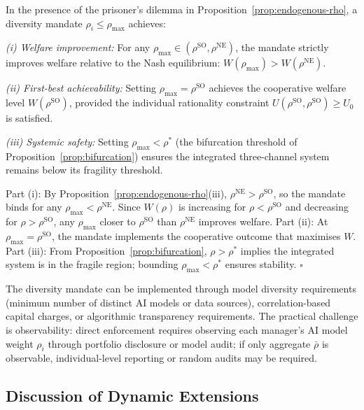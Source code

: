 \begin{proposition}\label{prop:diversity-mandate}
  In the presence of the prisoner's dilemma in Proposition~\ref{prop:endogenous-rho}, a diversity mandate $\rho_i \leq \rho_{\max}$ achieves:

  \emph{(i) Welfare improvement:} For any $\rho_{\max} \in (\rho^{\text{SO}}, \rho^{\text{NE}})$, the mandate strictly improves welfare relative to the Nash equilibrium: $W(\rho_{\max}) > W(\rho^{\text{NE}})$.

  \emph{(ii) First-best achievability:} Setting $\rho_{\max} = \rho^{\text{SO}}$ achieves the cooperative welfare level $W(\rho^{\text{SO}})$, provided the individual rationality constraint $U(\rho^{\text{SO}}, \rho^{\text{SO}}) \geq U_0$ is satisfied.

  \emph{(iii) Systemic safety:} Setting $\rho_{\max} < \rho^*$ (the bifurcation threshold of Proposition~\ref{prop:bifurcation}) ensures the integrated three-channel system remains below its fragility threshold.

   Part (i): By Proposition~\ref{prop:endogenous-rho}(iii), $\rho^{\text{NE}} > \rho^{\text{SO}}$, so the mandate binds for any $\rho_{\max} < \rho^{\text{NE}}$. Since $W(\rho)$ is increasing for $\rho < \rho^{\text{SO}}$ and decreasing for $\rho > \rho^{\text{SO}}$, any $\rho_{\max}$ closer to $\rho^{\text{SO}}$ than $\rho^{\text{NE}}$ improves welfare. Part (ii): At $\rho_{\max} = \rho^{\text{SO}}$, the mandate implements the cooperative outcome that maximises $W$. Part (iii): From Proposition~\ref{prop:bifurcation}, $\rho > \rho^*$ implies the integrated system is in the fragile region; bounding $\rho_{\max} < \rho^*$ ensures stability. $\square$
\end{proposition}

The diversity mandate can be implemented through model diversity requirements (minimum number of distinct AI models or data sources), correlation-based capital charges, or algorithmic transparency requirements. The practical challenge is observability: direct enforcement requires observing each manager's AI model weight $\rho_i$ through portfolio disclosure or model audit; if only aggregate $\bar{\rho}$ is observable, individual-level reporting or random audits may be required.

\subsection{Discussion of Dynamic Extensions}

